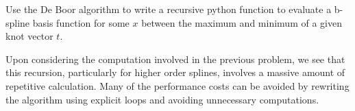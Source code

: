\begin{problem}
Use the De Boor algorithm to write a recursive python function to evaluate a b-spline basis function for some $x$ between the maximum and minimum of a given knot vector $t$.
\end{problem}

Upon considering the computation involved in the previous problem, we see that this recursion, particularly for higher order splines, involves a massive amount of repetitive calculation.
Many of the performance costs can be avoided by rewriting the algorithm using explicit loops and avoiding unnecessary computations.

